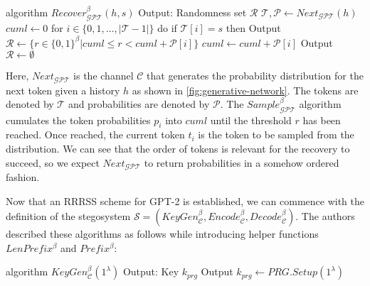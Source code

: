\begin{Pseudocode}[caption={
RRRSS $Recover$ algorithm for GPT-2 \cite{Meteor2021}.
Given a history $h$ and a sample $s$, return a set of possible random values used to generate $s$ with history $h$.
}]
algorithm $Recover_{\mathcal{GPT}}^\beta(h, s)$
  Output: Randomness set $\mathcal{R}$
  $\mathcal{T}, \mathcal{P} \leftarrow Next_{\mathcal{GPT}}(h)$
  $cuml \leftarrow 0$
  for $i \in \{ 0, 1, \dots, | \mathcal{T} - 1 | \}$ do
    if $\mathcal{T}[i] = s$ then
      Output $\mathcal{R} \leftarrow \{ r \in \{ 0, 1\}^\beta | cuml \leq r < cuml + \mathcal{P}[i] \}$
    $cuml \leftarrow cuml + \mathcal{P}[i]$
  Output $\mathcal{R} \leftarrow \emptyset$
\end{Pseudocode}

Here, $Next_{\mathcal{GPT}}$ is the channel $\mathcal{C}$ that generates the probability distribution for the next token given a history $h$ as shown in \autoref{fig:generative-network}.
The tokens are denoted by $\mathcal{T}$ and probabilities are denoted by $\mathcal{P}$.
The $Sample_{\mathcal{GPT}}^\beta$ algorithm cumulates the token probabilities $p_i$ into $cuml$ until the threshold $r$ has been reached.
Once reached, the current token $t_i$ is the token to be sampled from the distribution.
We can see that the order of tokens is relevant for the recovery to succeed, so we expect $Next_{\mathcal{GPT}}$ to return probabilities in a somehow ordered fashion.

Now that an RRRSS scheme for GPT-2 is established, we can commence with the definition of the stegosystem $\mathcal{S} = \left(KeyGen_{\mathcal{C}}^\beta, Encode_{\mathcal{C}}^\beta, Decode_{\mathcal{C}}^\beta \right)$.
The authors described these algorithms as follows while introducing helper functions $LenPrefix^\beta$ and $Prefix^\beta$:

\begin{Pseudocode}[caption={$KeyGen$ algorithm \cite{Meteor2021}}]
algorithm $KeyGen_{\mathcal{C}}^\beta(1^\lambda)$
  Output: Key $k_{prg}$
  Output $k_{prg} \leftarrow PRG.Setup(1^\lambda)$
\end{Pseudocode}%

